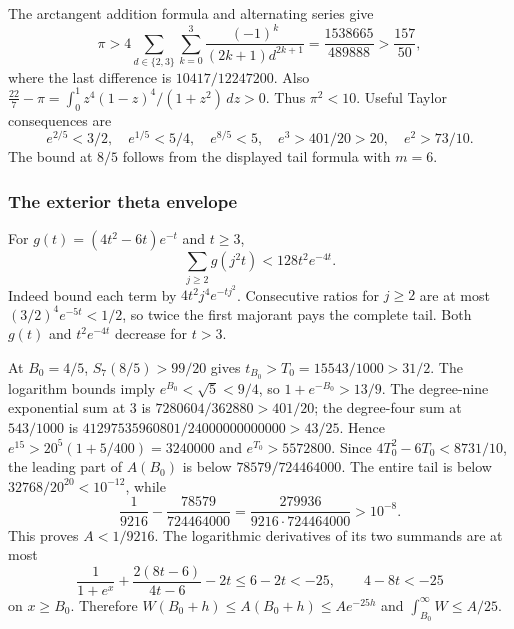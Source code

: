 \documentclass[11pt,a4paper]{article}
\numberwithin{equation}{section}
\theoremstyle{definition}\newtheorem{definition}[theorem]{Definition}
\theoremstyle{remark}\newtheorem{remark}[theorem]{Remark}
\begin{document}
The arctangent addition formula and alternating series give
\[
 \pi>4\sum_{d\in\{2,3\}}\sum_{k=0}^3
       \frac{(-1)^k}{(2k+1)d^{2k+1}}
 =\frac{1538665}{489888}>\frac{157}{50},
\]
where the last difference is $10417/12247200$.
Also
$\frac{22}{7}-\pi=\int_0^1z^4(1-z)^4/(1+z^2)\,dz>0$.
Thus $\pi^2<10$.
Useful Taylor consequences are
\[
 e^{2/5}<3/2,\quad e^{1/5}<5/4,\quad
 e^{8/5}<5,\quad e^3>401/20>20,\quad e^2>73/10.
\]
The bound at $8/5$ follows from the displayed tail formula with $m=6$.

\subsubsection{The exterior theta envelope}
For $g(t)=(4t^2-6t)e^{-t}$ and $t\ge3$,
\begin{equation}\label{c:eq:thetatotal}
 \sum_{j\ge2}g(j^2t)<128t^2e^{-4t}.
\end{equation}
Indeed bound each term by $4t^2j^4e^{-tj^2}$.
Consecutive ratios for $j\ge2$ are at most
$(3/2)^4e^{-5t}<1/2$, so twice the first majorant pays the complete tail.
Both $g(t)$ and $t^2e^{-4t}$ decrease for $t>3$.

At ${B_0}=4/5$, $S_7(8/5)>99/20$ gives
$t_{B_0}>T_0=15543/1000>31/2$.
The logarithm bounds imply $e^{B_0}<\sqrt5<9/4$, so $1+e^{-{B_0}}>13/9$.
The degree-nine exponential sum at $3$ is
$7280604/362880>401/20$; the degree-four sum at $543/1000$ is
$41297535960801/24000000000000>43/25$.
Hence $e^{15}>20^5(1+5/400)=3240000$ and $e^{T_0}>5572800$.
Since $4T_0^2-6T_0<8731/10$, the leading part of $A({B_0})$ is below
$78579/724464000$.
The entire tail is below $32768/20^{20}<10^{-12}$, while
\[
 \frac1{9216}-\frac{78579}{724464000}
 =\frac{279936}{9216\cdot724464000}>10^{-8}.
\]
This proves $A<1/9216$.
The logarithmic derivatives of its two summands are at most
\[
 \frac1{1+e^x}+\frac{2(8t-6)}{4t-6}-2t\le6-2t<-25,
 \qquad 4-8t<-25
\]
on $x\ge {B_0}$.
Therefore $W({B_0}+h)\le A({B_0}+h)\le Ae^{-25h}$ and
$\int_{B_0}^\infty W\le A/25$.
\end{document}
